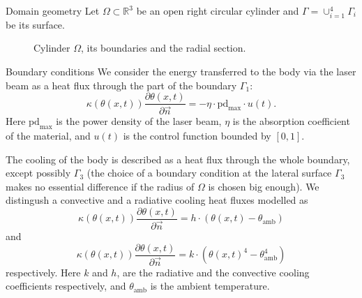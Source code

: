 \documentclass[
	9pt,
	hyperref = {unicode,pdfpagelabels=false},
	notheorems,
	aspectratio=169
	]{beamer}
\begin{document}
\begin{frame}{Domain geometry}
Let $\Omega	\subset \mathbb{R}^3$ be an open right circular cylinder and $\Gamma = \cup_{i=1}^4 \Gamma_i$ be its surface.

	\begin{figure}
		 
		\caption{Cylinder $\Omega$, its boundaries and the radial section.}
	\end{figure}
\end{frame}


\begin{frame}{Boundary conditions}
We consider the energy transferred to the body via the laser beam as a heat flux through the part of the boundary $\Gamma_1$:
\begin{equation}
	\kappa(\theta(x,t)) \frac{\partial \theta(x,t)}{\partial \vec{n}} = - \eta \cdot \text{pd}_{\max} \cdot u(t).
\end{equation}
Here $\text{pd}_{\max}$ is the power density of the laser beam, $\eta$ is the absorption coefficient of the material, and $u(t)$ is the control function bounded by $[0,1]$.

The cooling of the body is described as a heat flux through the whole boundary, except possibly $\Gamma_3$ (the choice of a boundary condition at the lateral surface $\Gamma_3$ makes no essential difference if the radius of $\Omega$ is chosen big enough).
We distingush a convective and a radiative cooling heat fluxes modelled as
\begin{equation}
	\kappa(\theta(x,t)) \frac{\partial \theta(x,t)}{\partial \vec{n}} = h \cdot (\theta(x,t) - \theta_\text{amb})
\end{equation}
and
\begin{equation}
	\kappa(\theta(x,t)) \frac{\partial \theta(x,t)}{\partial \vec{n}} = k \cdot (\theta(x,t)^4 - \theta^4_\text{amb})
\end{equation}
respectively.
Here $k$ and $h$, are the radiative and the convective cooling coefficients respectively, and $\theta_\text{amb}$ is the ambient temperature.
\end{frame}
\end{document}
